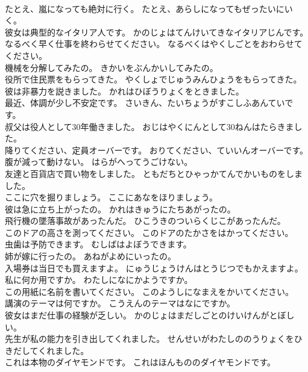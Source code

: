 \documentclass[8pt]{extreport}
\begin{document}
\begin{CJK}{UTF8}{min}
\\	たとえ、嵐になっても絶対に行く。	たとえ、あらしになってもぜったいにいく。 
\\	彼女は典型的なイタリア人です。	かのじょはてんけいてきなイタリアじんです。 
\\	なるべく早く仕事を終わらせてください。	なるべくはやくしごとをおわらせてください。 
\\	機械を分解してみたの。	きかいをぶんかいしてみたの。 
\\	役所で住民票をもらってきた。	やくしょでじゅうみんひょうをもらってきた。 
\\	彼は非暴力を説きました。	かれはひぼうりょくをときました。 
\\	最近、体調が少し不安定です。	さいきん、たいちょうがすこしふあんていです。 
\\	叔父は役人として30年働きました。	おじはやくにんとして30ねんはたらきました。 
\\	降りてください、定員オーバーです。	おりてください、ていいんオーバーです。 
\\	腹が減って動けない。	はらがへってうごけない。 
\\	友達と百貨店で買い物をしました。	ともだちとひゃっかてんでかいものをしました。 
\\	ここに穴を掘りましょう。	ここにあなをほりましょう。 
\\	彼は急に立ち上がったの。	かれはきゅうにたちあがったの。 
\\	飛行機の墜落事故があったんだ。	ひこうきのついらくじこがあったんだ。 
\\	このドアの高さを測ってください。	このドアのたかさをはかってください。 
\\	虫歯は予防できます。	むしばはよぼうできます。 
\\	姉が嫁に行ったの。	あねがよめにいったの。 
\\	入場券は当日でも買えますよ。	にゅうじょうけんはとうじつでもかえますよ。 
\\	私に何か用ですか。	わたしになにかようですか。 
\\	この用紙に名前を書いてください。	このようしになまえをかいてください。 
\\	講演のテーマは何ですか。	こうえんのテーマはなにですか。 
\\	彼女はまだ仕事の経験が乏しい。	かのじょはまだしごとのけいけんがとぼしい。 
\\	先生が私の能力を引き出してくれました。	せんせいがわたしののうりょくをひきだしてくれました。 
\\	これは本物のダイヤモンドです。	これはほんもののダイヤモンドです。 

\end{CJK}
\end{document}
